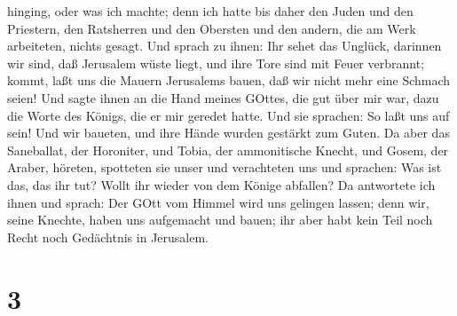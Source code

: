 hinging, oder was ich machte; denn ich hatte bis daher den Juden und den
Priestern, den Ratsherren und den Obersten und den andern, die am Werk
arbeiteten, nichts gesagt.  Und sprach zu ihnen: Ihr sehet
das Unglück, darinnen wir sind, daß Jerusalem wüste liegt, und ihre Tore
sind mit Feuer verbrannt; kommt, laßt uns die Mauern Jerusalems bauen,
daß wir nicht mehr eine Schmach seien!  Und sagte ihnen an
die Hand meines GOttes, die gut über mir war, dazu die Worte des Königs,
die er mir geredet hatte. Und sie sprachen: So laßt uns auf sein! Und
wir baueten, und ihre Hände wurden gestärkt zum Guten.  Da
aber das Saneballat, der Horoniter, und Tobia, der ammonitische Knecht,
und Gosem, der Araber, höreten, spotteten sie unser und verachteten uns
und sprachen: Was ist das, das ihr tut? Wollt ihr wieder von dem Könige
abfallen?  Da antwortete ich ihnen und sprach: Der GOtt vom
Himmel wird uns gelingen lassen; denn wir, seine Knechte, haben uns
aufgemacht und bauen; ihr aber habt kein Teil noch Recht noch Gedächtnis
in Jerusalem.

\hypertarget{section-2}{%
\section{3}\label{section-2}}


